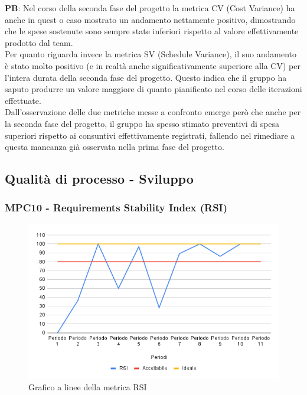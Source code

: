 \documentclass[10pt]{article}
\begin{document}
\begin{justify}
\noindent
\textbf{PB}: Nel corso della seconda fase del progetto la metrica CV (Cost Variance) ha anche in quest o caso mostrato un andamento nettamente positivo, dimostrando
che le spese sostenute sono sempre state inferiori rispetto al valore effettivamente prodotto dal team.\\
Per quanto riguarda invece la metrica SV (Schedule Variance), il suo andamento è stato molto positivo (e in realtà anche significativamente superiore alla CV) per l'intera durata
della seconda fase del progetto. Questo indica che il gruppo ha saputo produrre un valore maggiore di quanto pianificato nel corso delle iterazioni effettuate.\\
Dall'osservazione delle due metriche messe a confronto emerge però che anche per la seconda fase del progetto, il gruppo ha spesso stimato preventivi di spesa superiori
rispetto ai consuntivi effettivamente registrati, fallendo nel rimediare a questa mancanza già osservata nella prima fase del progetto.\\



\subsection{Qualità di processo - Sviluppo}
\subsubsection{MPC10 - Requirements Stability Index (RSI)}

\begin{figure}[H]
  \centering
  \includegraphics[width=0.9\linewidth]{RSI.png}
  \caption{Grafico a linee della metrica RSI}
  \label{fig:RSIchart}
\end{figure}


\end{justify}
\end{document}
